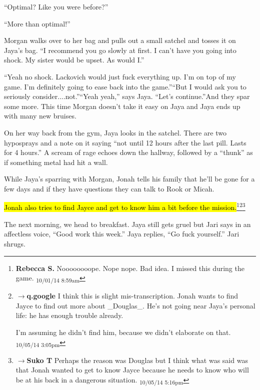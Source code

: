 ``Optimal?  Like you were before?''

``More than optimal!''

Morgan walks over to her bag and pulls out a small satchel and tosses it on Jaya's bag.  ``I recommend you go slowly at first.  I can't have you going into shock.  My sister would be upset.  As would I.''

``Yeah no shock.  Lackovich would just fuck everything up.  I'm on top of my game.  I'm definitely going to ease back into the game.''``But I would ask you to seriously consider....not.''``Yeah yeah,'' says Jaya.  ``Let's continue.''And they spar some more.  This time Morgan doesn't take it easy on Jaya and Jaya ends up with many new bruises.



On her way back from the gym, Jaya looks in the satchel. There are two hyposprays and a note on it saying ``not until 12 hours after the last pill.  Lasts for 4 hours.''   A scream of rage echoes down the hallway, followed by a ``thunk'' as if something metal had hit a wall.



While Jaya's sparring with Morgan, Jonah tells his family that he'll be gone for a few days and if they have questions they can talk to Rook or Micah.



\hl{Jonah also tries to find Jayce and get to know him a bit before the mission.}\footnote{\textbf{Rebecca S. }Noooooooope. Nope nope. Bad idea.  I missed this during the game. \textsubscript{10/01/14 8:59am}}\footnote{$\rightarrow$\textbf{q.google }I think this is slight mis-transcription.  Jonah wants to find Jayce to find out more about \_Douglas\_.  He's not going near Jaya's personal life: he has enough trouble already.

I'm assuming he didn't find him, because we didn't elaborate on that. \textsubscript{10/05/14 3:05pm}}\footnote{$\rightarrow$\textbf{Suko T }Perhaps the reason was Douglas but I think what was said was that Jonah wanted to get to know Jayce because he needs to know who will be at his back in a dangerous situation. \textsubscript{10/05/14 5:16pm}}





The next morning, we head to breakfast.  Jaya still gets gruel but Jari says in an affectless voice, ``Good work this week.''  Jaya replies, ``Go fuck yourself.''  Jari shrugs.



